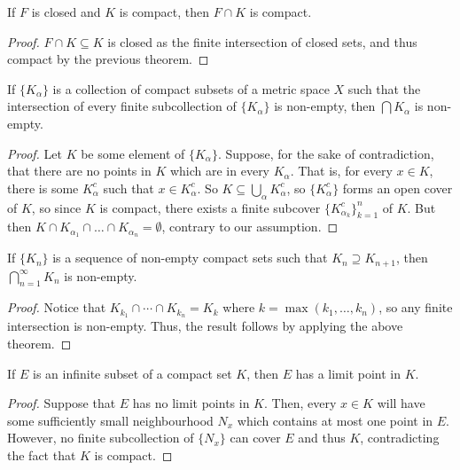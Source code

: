 \begin{corollary}
If $F$ is closed and $K$ is compact, then $F \cap K$ is compact.

\begin{proof}
$F \cap K \subseteq K$ is closed as the finite intersection of closed sets, and thus compact by the previous theorem.
\end{proof}
\end{corollary}

\begin{theorem}
If $\{K_\alpha\}$ is a collection of compact subsets of a metric space $X$ such that the intersection of every finite subcollection of $\{K_\alpha\}$ is non-empty, then $\bigcap K_\alpha$ is non-empty. 

\begin{proof}
Let $K$ be some element of $\{K_\alpha\}$. Suppose, for the sake of contradiction, that there are no points in $K$ which are in every $K_\alpha$. That is, for every $x \in K$, there is some $K_\alpha^c$ such that $x \in K_\alpha^c$. So $K \subseteq \bigcup_\alpha K_\alpha^c$, so $\{K_\alpha^c\}$ forms an open cover of $K$, so since $K$ is compact, there exists a finite subcover $\{K_{\alpha_k}^c\}_{k=1}^{n}$ of $K$. But then $K \cap K_{\alpha_1} \cap \dotsc \cap K_{\alpha_n} = \emptyset$, contrary to our assumption.
\end{proof}
\end{theorem}

\begin{corollary}
If $\{K_n\}$ is a sequence of non-empty compact sets such that $K_n \supseteq K_{n+1}$, then $\bigcap_{n=1}^{\infty} K_n$ is non-empty.

\begin{proof}
Notice that $K_{k_1} \cap \dotsb \cap K_{k_n} = K_k$ where $k = \max(k_1, \dotsc, k_n)$, so any finite intersection is non-empty. Thus, the result follows by applying the above theorem.
\end{proof}
\end{corollary}

\begin{theorem}
If $E$ is an infinite subset of a compact set $K$, then $E$ has a limit point in $K$.

\begin{proof}
Suppose that $E$ has no limit points in $K$. Then, every $x \in K$ will have some sufficiently small neighbourhood $N_x$ which contains at most one point in $E$. However, no finite subcollection of $\{N_x\}$ can cover $E$ and thus $K$, contradicting the fact that $K$ is compact.
\end{proof}
\end{theorem}

